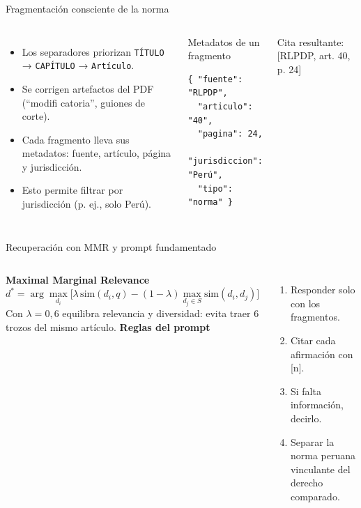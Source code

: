\documentclass[aspectratio=169,10pt]{beamer}
\begin{document}
\begin{frame}[fragile]{Fragmentación consciente de la norma}
\begin{columns}[T]
\begin{itemize}\small
  \item Los separadores priorizan \texttt{TÍTULO} → \texttt{CAPÍTULO} → \texttt{Artículo}.
  \item Se corrigen artefactos del PDF (``modifi catoria'', guiones de corte).
  \item Cada fragmento lleva sus metadatos: fuente, \alert{artículo}, \alert{página} y jurisdicción.
  \item Esto permite filtrar por jurisdicción (p. ej., solo Perú).
\end{itemize}
\begin{block}{Metadatos de un fragmento}
\scriptsize
\begin{verbatim}
{ "fuente": "RLPDP",
  "articulo": "40",
  "pagina": 24,
  "jurisdiccion": "Perú",
  "tipo": "norma" }
\end{verbatim}
\end{block}
\small Cita resultante: \alert{[RLPDP, art. 40, p. 24]}
\end{columns}
\end{frame}

\begin{frame}{Recuperación con MMR y prompt fundamentado}
\begin{columns}[T]
\textbf{Maximal Marginal Relevance}
{\small\[
d^{*}=\arg\max_{d_i}\Big[\lambda\,\mathrm{sim}(d_i,q)-(1-\lambda)\max_{d_j\in S}\mathrm{sim}(d_i,d_j)\Big]
\]}
\small Con $\lambda=0{,}6$ equilibra relevancia y diversidad: evita traer 6 trozos del mismo artículo.
\textbf{Reglas del prompt}
\begin{enumerate}\small
  \item Responder solo con los fragmentos.
  \item Citar cada afirmación con [n].
  \item Si falta información, decirlo.
  \item Separar la norma peruana vinculante del derecho comparado.
\end{enumerate}
\end{columns}
\end{frame}
\end{document}

